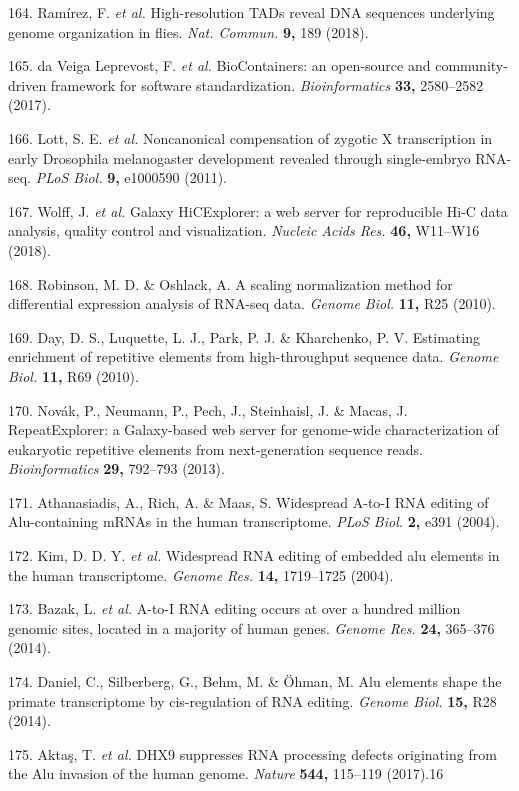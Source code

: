 \documentclass[11pt,twoside]{MPIthesis}
\theoremstyle{definition}
\theoremstyle{definition}
\theoremstyle{definition}
\theoremstyle{remark}
\begin{document}
164. Ramírez, F. \emph{et al.} High-resolution TADs reveal DNA sequences
underlying genome organization in flies. \emph{Nat. Commun.} \textbf{9,}
189 (2018).

165. da Veiga Leprevost, F. \emph{et al.} BioContainers: an open-source
and community-driven framework for software standardization.
\emph{Bioinformatics} \textbf{33,} 2580--2582 (2017).

166. Lott, S. E. \emph{et al.} Noncanonical compensation of zygotic X
transcription in early Drosophila melanogaster development revealed
through single-embryo RNA-seq. \emph{PLoS Biol.} \textbf{9,} e1000590
(2011).

167. Wolff, J. \emph{et al.} Galaxy HiCExplorer: a web server for
reproducible Hi-C data analysis, quality control and visualization.
\emph{Nucleic Acids Res.} \textbf{46,} W11--W16 (2018).

168. Robinson, M. D. \& Oshlack, A. A scaling normalization method for
differential expression analysis of RNA-seq data. \emph{Genome Biol.}
\textbf{11,} R25 (2010).

169. Day, D. S., Luquette, L. J., Park, P. J. \& Kharchenko, P. V.
Estimating enrichment of repetitive elements from high-throughput
sequence data. \emph{Genome Biol.} \textbf{11,} R69 (2010).

170. Novák, P., Neumann, P., Pech, J., Steinhaisl, J. \& Macas, J.
RepeatExplorer: a Galaxy-based web server for genome-wide
characterization of eukaryotic repetitive elements from next-generation
sequence reads. \emph{Bioinformatics} \textbf{29,} 792--793 (2013).

171. Athanasiadis, A., Rich, A. \& Maas, S. Widespread A-to-I RNA
editing of Alu-containing mRNAs in the human transcriptome. \emph{PLoS
Biol.} \textbf{2,} e391 (2004).

172. Kim, D. D. Y. \emph{et al.} Widespread RNA editing of embedded alu
elements in the human transcriptome. \emph{Genome Res.} \textbf{14,}
1719--1725 (2004).

173. Bazak, L. \emph{et al.} A-to-I RNA editing occurs at over a hundred
million genomic sites, located in a majority of human genes.
\emph{Genome Res.} \textbf{24,} 365--376 (2014).

174. Daniel, C., Silberberg, G., Behm, M. \& Öhman, M. Alu elements
shape the primate transcriptome by cis-regulation of RNA editing.
\emph{Genome Biol.} \textbf{15,} R28 (2014).

175. Aktaş, T. \emph{et al.} DHX9 suppresses RNA processing defects
originating from the Alu invasion of the human genome. \emph{Nature}
\textbf{544,} 115--119 (2017).16
\end{document}
